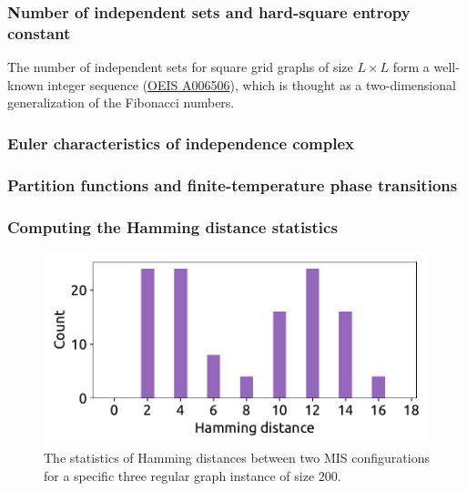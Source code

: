 \documentclass[onefignum, onetabnum]{siamart190516}
\newcommand{\<}{\langle}
\renewcommand{\>}{\rangle}
\begin{document}
\subsubsection{Number of independent sets and hard-square entropy constant}
The number of independent sets for square grid graphs of size $L \times L$ form a well-known integer sequence (\href{https://oeis.org/A006506}{OEIS A006506}), which is thought as a two-dimensional generalization of the Fibonacci numbers.

\subsubsection{Euler characteristics of independence complex}

\subsubsection{Partition functions and finite-temperature phase transitions}

\subsubsection{Computing the Hamming distance statistics}

\begin{figure} 
    \centering
    \includegraphics[width=\textwidth, trim={0cm 0cm 0cm 0cm}, clip]{figures/fig3.pdf}
    \caption{The statistics of Hamming distances between two MIS configurations for a specific three regular graph instance of size $200$.}
    \label{fig:hamming}
\end{figure}
\end{document}
